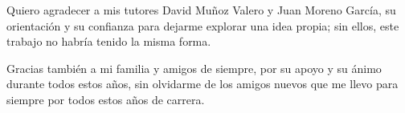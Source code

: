\begin{agradecimientos}

Quiero agradecer a mis tutores David Muñoz Valero y Juan Moreno García, su orientación y su confianza para dejarme explorar una idea propia; sin ellos, este trabajo no habría tenido la misma forma.

Gracias también a mi familia y amigos de siempre, por su apoyo y su ánimo durante todos estos años, sin olvidarme de los amigos nuevos que me llevo para siempre por todos estos años de carrera.

\end{agradecimientos}